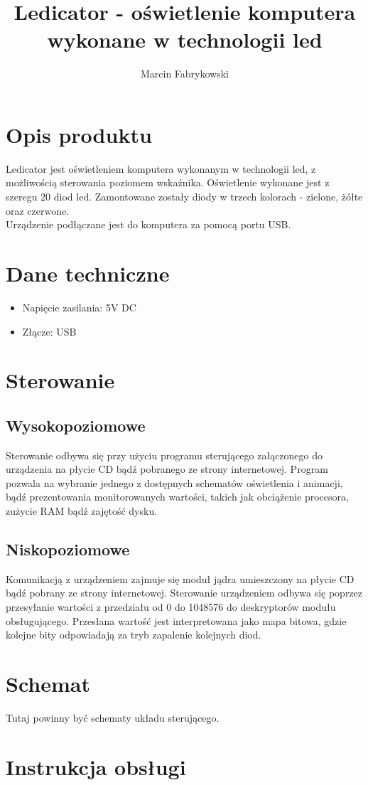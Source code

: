 \documentclass[a4paper,12pt]{article}
\author{Marcin Fabrykowski}
\title{Ledicator - oświetlenie komputera wykonane w technologii led}
\begin{document}
\maketitle
\newpage
\tableofcontents
\newpage
\section{Opis produktu}
	Ledicator jest oświetleniem komputera wykonanym w technologii led, z możliwością sterowania poziomem wskaźnika.
	Oświetlenie wykonane jest z szeregu 20 diod led.
	Zamontowane zostały diody w trzech kolorach - zielone, żółte oraz czerwone.\\
	Urządzenie podłączane jest do komputera za pomocą portu USB.
\section{Dane techniczne}
	\begin{itemize}
	\item Napięcie zasilania: 5V DC
	\item Złącze: USB
	\end{itemize}
\section{Sterowanie}
	\subsection{Wysokopoziomowe}
		Sterowanie odbywa się przy użyciu programu sterującego załączonego do urządzenia na płycie CD bądź pobranego ze strony internetowej.
		Program pozwala na wybranie jednego z dostępnych schematów oświetlenia i animacji, bądź prezentowania monitorowanych wartości, takich jak obciążenie procesora, zużycie RAM bądź zajętość dysku.
	\subsection{Niskopoziomowe}
		Komunikacją z urządzeniem zajmuje się moduł jądra umieszczony na płycie CD bądź pobrany ze strony internetowej.	
		Sterowanie urządzeniem odbywa się poprzez przesyłanie wartości z przedziału od 0 do 1048576 do deskryptorów modułu obsługującego.
		Przesłana wartość jest interpretowana jako mapa bitowa, gdzie kolejne bity odpowiadają za tryb zapalenie kolejnych diod.
\section{Schemat}
	Tutaj powinny być schematy układu sterującego.
\section{Instrukcja obsługi}
	
\end{document}
